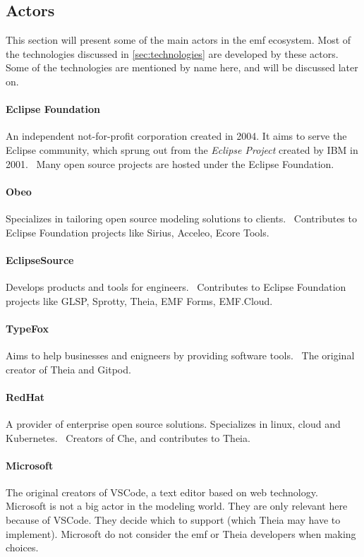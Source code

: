 \subsection{Actors}

This section will present some of the main actors in the \acrlong{emf} ecosystem.
Most of the technologies discussed in \cref{sec:technologies} are developed by these actors.
Some of the technologies are mentioned by name here, and will be discussed later on.

\paragraph*{Eclipse Foundation} %
An independent not-for-profit corporation created in 2004.
It aims to serve the Eclipse community, which sprung out from the \emph{Eclipse Project} created by IBM in 2001.~\cite{m.milinkovichEclipseFoundationEclipse2005}
Many \gls{open source} projects are hosted under the Eclipse Foundation.

\paragraph*{Obeo} %
Specializes in tailoring \gls{open source} modeling solutions to clients.~\cite{ObeoFewWords}
Contributes to Eclipse Foundation projects like Sirius, Acceleo, Ecore Tools.~\cite{ObeoProductsPresentation}

\paragraph*{EclipseSource} %
Develops products and tools for engineers.~\cite{eclipsesourceServices}
Contributes to Eclipse Foundation projects like GLSP, Sprotty, Theia, EMF Forms, EMF.Cloud.~\cite{guindonEclipseMembershipEclipseSource}

\paragraph*{TypeFox} %
Aims to help businesses and enigneers by providing software tools.~\cite{typefoxTypeFoxSmartTools}
The original creator of Theia and Gitpod.

\paragraph*{RedHat} %
A provider of enterprise \gls{open source} solutions.
Specializes in linux, \gls{cloud} and \gls{Kubernetes}.~\cite{redhatWorldOpenSource}
Creators of Che, and contributes to Theia.

\paragraph*{Microsoft}
The original creators of \gls{VSCode}, a text editor based on web technology.
Microsoft is not a big actor in the modeling world.
They are only relevant here because of \gls{VSCode}.
They decide which  to support (which \gls{Theia} may have to implement).
Microsoft do not consider the \acrshort{emf} or \gls{Theia} developers when  making choices. %
